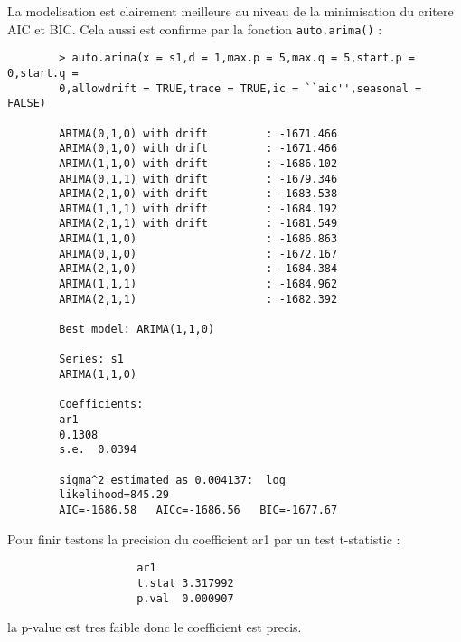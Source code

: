         La modelisation est clairement meilleure au niveau de la minimisation du
        critere AIC et BIC. Cela aussi est confirme par la fonction
        \verb+auto.arima()+ :
        \begin{verbatim}
        > auto.arima(x = s1,d = 1,max.p = 5,max.q = 5,start.p = 0,start.q =
        0,allowdrift = TRUE,trace = TRUE,ic = ``aic'',seasonal = FALSE)

        ARIMA(0,1,0) with drift         : -1671.466
        ARIMA(0,1,0) with drift         : -1671.466
        ARIMA(1,1,0) with drift         : -1686.102
        ARIMA(0,1,1) with drift         : -1679.346
        ARIMA(2,1,0) with drift         : -1683.538
        ARIMA(1,1,1) with drift         : -1684.192
        ARIMA(2,1,1) with drift         : -1681.549
        ARIMA(1,1,0)                    : -1686.863
        ARIMA(0,1,0)                    : -1672.167
        ARIMA(2,1,0)                    : -1684.384
        ARIMA(1,1,1)                    : -1684.962
        ARIMA(2,1,1)                    : -1682.392

        Best model: ARIMA(1,1,0)                    

        Series: s1 
        ARIMA(1,1,0)                    

        Coefficients:
        ar1
        0.1308
        s.e.  0.0394

        sigma^2 estimated as 0.004137:  log
        likelihood=845.29
        AIC=-1686.58   AICc=-1686.56   BIC=-1677.67
        \end{verbatim}
        Pour finir testons la precision du coefficient ar1 par un test
        t-statistic :
        \begin{verbatim}
                    ar1
                    t.stat 3.317992
                    p.val  0.000907
        \end{verbatim}
        la p-value est tres faible donc le coefficient est precis.
